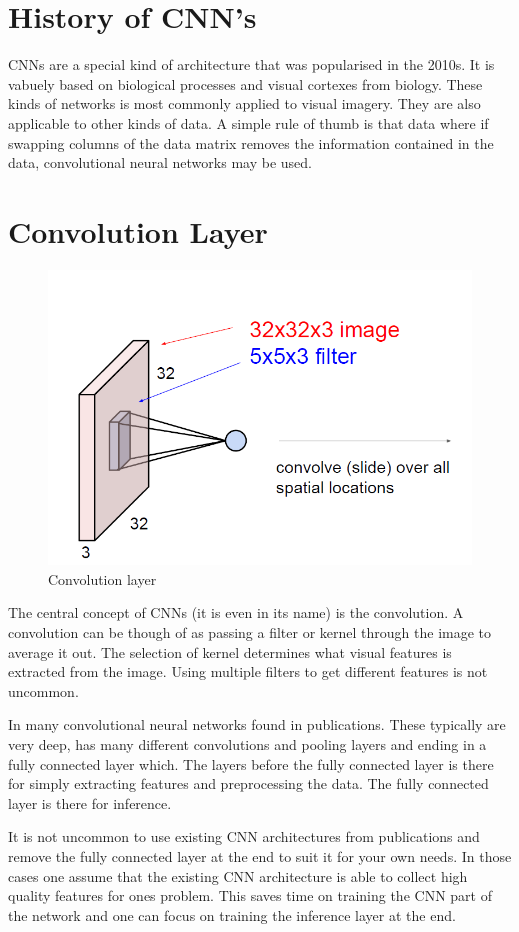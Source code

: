 \section{History of CNN's}
CNNs are a special kind of architecture that was popularised in the 2010s.
It is vabuely based on biological processes and visual cortexes from biology.
These kinds of networks is most commonly applied to visual imagery. 
They are also applicable to other kinds of data. A simple rule of thumb 
is that data where if swapping columns of the data matrix removes the 
information contained in the data, convolutional neural networks may be used.

\section{Convolution Layer}

\begin{figure}[H]
    \centering
    \includegraphics[width=0.5\linewidth]{figures/convolution.PNG}
    \caption{Convolution layer}
\end{figure}

The central concept of CNNs (it is even in its name) is the convolution. 
A convolution can be though of as passing a filter or kernel through the image
to average it out. The selection of kernel determines what visual features is 
extracted from the image. Using multiple filters to get different features
is not uncommon.

\medskip

In many convolutional neural networks found in publications. These typically are
very deep, has many different convolutions and pooling layers and ending in a 
fully connected layer which. The layers before the fully connected layer 
is there for simply extracting features and preprocessing the data. The fully 
connected layer is there for inference.

\medskip

It is not uncommon to use existing CNN architectures from publications and
remove the fully connected layer at the end to suit it for your own needs.
In those cases one assume that the existing CNN architecture is able to collect
high quality features for ones problem. This saves time on training the
CNN part of the network and one can focus on training the inference layer at the
end.

